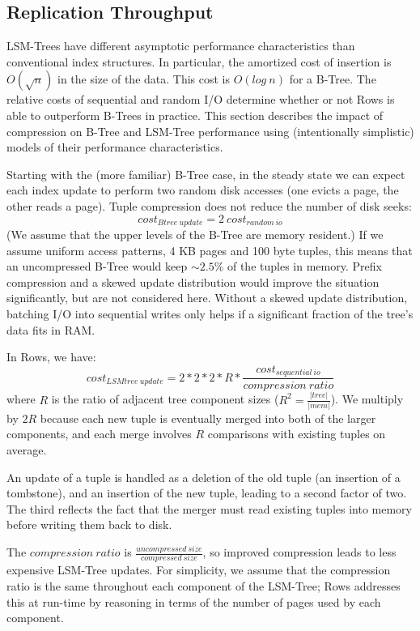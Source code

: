 \documentclass{sig-alternate-sigmod08}
\newcommand{\rows}{Rows\xspace}
\begin{document}
\subsection{Replication Throughput}

LSM-Trees have different asymptotic performance characteristics than
conventional index structures.  In particular, the amortized cost of
insertion is $O(\sqrt{n})$ in the size of the data.  This cost is
$O(log~n)$ for a B-Tree.  The relative costs of sequential and random
I/O determine whether or not \rows is able to outperform B-Trees in
practice.  This section describes the impact of compression on B-Tree
and LSM-Tree performance using (intentionally simplistic) models of
their performance characteristics.

Starting with the (more familiar) B-Tree case, in the steady state we
can expect each index update to perform two random disk accesses (one
evicts a page, the other reads a page).  Tuple compression does not
reduce the number of disk seeks:
\[
   cost_{Btree~update}=2~cost_{random~io}
\]
(We assume that the upper levels of the B-Tree are memory resident.)  If
we assume uniform access patterns, 4 KB pages and 100 byte tuples,
this means that an uncompressed B-Tree would keep $\sim2.5\%$ of the
tuples in memory.  Prefix compression and a skewed update distribution
would improve the situation significantly, but are not considered
here.  Without a skewed update distribution, batching I/O into
sequential writes only helps if a significant fraction of the tree's
data fits in RAM.

In \rows, we have:
\[
   cost_{LSMtree~update}=2*2*2*R*\frac{cost_{sequential~io}}{compression~ratio}  %
\]
where $R$ is the ratio of adjacent tree component sizes
($R^2=\frac{|tree|}{|mem|}$).  We multiply by $2R$ because each new
tuple is eventually merged into both of the larger components, and
each merge involves $R$ comparisons with existing tuples on average.

An update of a tuple is handled as a deletion of the old tuple (an
insertion of a tombstone), and an insertion of the new tuple, leading
to a second factor of two.  The third reflects the fact that the
merger must read existing tuples into memory before writing them back
to disk.

The $compression~ratio$ is
$\frac{uncompressed~size}{compressed~size}$, so improved compression
leads to less expensive LSM-Tree updates.  For simplicity, we assume
that the compression ratio is the same throughout each component of
the LSM-Tree; \rows addresses this at run-time by reasoning in terms
of the number of pages used by each component.
\end{document}
